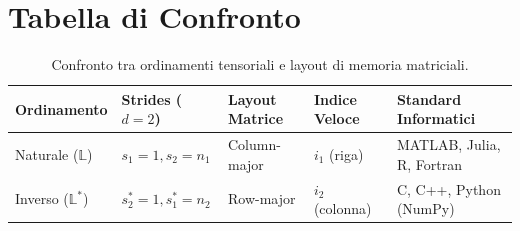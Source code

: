 \documentclass{article}
\renewcommand{\L}{\mathbb{L}}
\begin{document}
\section{Tabella di Confronto}

\begin{table}[ht]
\centering
\begin{tabular}{@{}lllll@{}}
\toprule
Ordinamento & Strides ($d=2$) & Layout Matrice & Indice Veloce & Standard Informatici \\ \midrule
Naturale ($\L$) & $s_1=1, s_2=n_1$ & Column-major & $i_1$ (riga) & MATLAB, Julia, R, Fortran \\
Inverso ($\L^*$) & $s_2^*=1, s_1^*=n_2$ & Row-major & $i_2$ (colonna) & C, C++, Python (NumPy) \\ \bottomrule
\end{tabular}
\caption{Confronto tra ordinamenti tensoriali e layout di memoria matriciali.}
\end{table}
\end{document}
